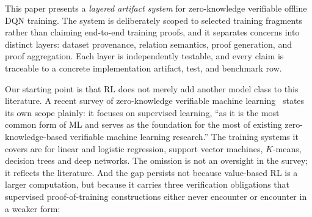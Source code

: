 This paper presents a \emph{layered artifact system} for zero-knowledge
verifiable offline DQN training. The system is deliberately scoped to selected
training fragments rather than claiming end-to-end training proofs, and it
separates concerns into distinct layers: dataset provenance, relation
semantics, proof generation, and proof aggregation. Each layer is independently
testable, and every claim is traceable to a concrete implementation artifact,
test, and benchmark row.

Our starting point is that RL does not merely add another model class to this
literature. A recent survey of zero-knowledge verifiable machine
learning~\cite{zkmlsurvey2026} states its own scope plainly: it focuses on
supervised learning, ``as it is the most common form of ML and serves as the
foundation for the most of existing zero-knowledge-based verifiable machine
learning research.'' The training systems it covers are for linear and logistic
regression, support vector machines, $K$-means, decision trees and deep
networks. The omission is not an oversight in the survey; it reflects the
literature. And the gap persists not because value-based RL is a larger
computation, but because it carries three verification obligations that
supervised proof-of-training constructions either never encounter or encounter
in a weaker form:

